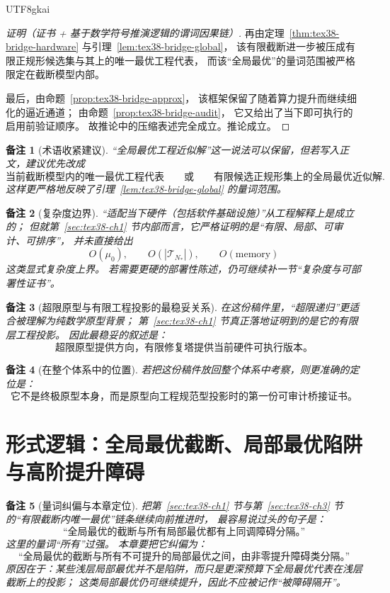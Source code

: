 \documentclass[12pt]{article}
\newtheorem{remark}{备注}[section]
\begin{document}
\begin{CJK*}{UTF8}{gkai}
\begin{proof}[证明（证书 + 基于数学符号推演逻辑的谓词因果链）]
再由定理~\ref{thm:tex38-bridge-hardware} 与引理~\ref{lem:tex38-bridge-global}，
该有限截断进一步被压成有限正规形候选集与其上的唯一最优工程代表，
而该“全局最优”的量词范围被严格限定在截断模型内部。

最后，由命题~\ref{prop:tex38-bridge-approx}，
该框架保留了随着算力提升而继续细化的逼近通道；
由命题~\ref{prop:tex38-bridge-audit}，
它又给出了当下即可执行的启用前验证顺序。
故推论中的压缩表述完全成立。推论成立。
\end{proof}

\begin{remark}[术语收紧建议]
“全局最优工程近似解”这一说法可以保留，但若写入正文，建议优先改成
\[
  \text{当前截断模型内的唯一最优工程代表}
  \qquad\text{或}\qquad
  \text{有限候选正规形集上的全局最优近似解}.
\]
这样更严格地反映了引理~\ref{lem:tex38-bridge-global} 的量词范围。
\end{remark}

\begin{remark}[复杂度边界]
“适配当下硬件（包括软件基础设施）”从工程解释上是成立的；
但就第~\ref{sec:tex38-ch1} 节内部而言，它严格证明的是“有限、局部、可审计、可排序”，
并未直接给出
\[
  O(\mu_0),\qquad O(|\mathcal{T}_{N_\ast}|),\qquad O(\text{memory})
\]
这类显式复杂度上界。
若需要更硬的部署性陈述，仍可继续补一节“复杂度与可部署性证书”。
\end{remark}

\begin{remark}[超限原型与有限工程投影的最稳妥关系]
在这份稿件里，“超限递归”更适合被理解为纯数学原型背景；
第~\ref{sec:tex38-ch1} 节真正落地证明到的是它的有限层工程投影。
因此最稳妥的叙述是：
\[
  \text{超限原型提供方向，有限修复塔提供当前硬件可执行版本。}
\]
\end{remark}

\begin{remark}[在整个体系中的位置]
若把这份稿件放回整个体系中考察，则更准确的定位是：
\[
  \text{它不是终极原型本身，而是原型向工程规范型投影时的第一份可审计桥接证书。}
\]
\end{remark}

\clearpage

\section{形式逻辑：全局最优截断、局部最优陷阱与高阶提升障碍}
\label{sec:tex38-ch3a}

\begin{remark}[量词纠偏与本章定位]
把第~\ref{sec:tex38-ch1} 节与第~\ref{sec:tex38-ch3} 节的“有限截断内唯一最优”链条继续向前推进时，
最容易说过头的句子是：
\[
  \text{“全局最优的截断与所有局部最优都有上同调障碍分隔。”}
\]
这里的量词“所有”过强。
本章要把它纠偏为：
\[
  \text{“全局最优的截断与所有不可提升的局部最优之间，由非零提升障碍类分隔。”}
\]
原因在于：某些浅层局部最优并不是陷阱，而只是更深预算下全局最优代表在浅层截断上的投影；
这类局部最优仍可继续提升，因此不应被记作“被障碍隔开”。
\end{remark}


\end{CJK*}
\end{document}
